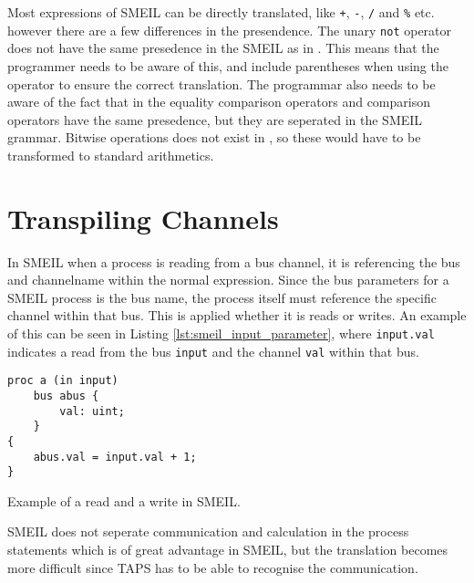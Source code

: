 Most expressions of SMEIL can be directly translated, like \texttt{+}, \texttt{-}, \texttt{/} and \texttt{\%} etc. however there are a few differences in the presendence. The unary \texttt{not} operator does not have the same presedence in the SMEIL as in \cspm{}. This means that the programmer needs to be aware of this, and include parentheses when using the operator to ensure the correct translation. The programmar also needs to be aware of the fact that in \cspm{} the equality comparison operators and comparison operators have the same presedence, but they are seperated in the SMEIL grammar.
Bitwise operations does not exist in \cspm{}, so these would have to be transformed to standard arithmetics. %

\section{Transpiling Channels}
In SMEIL when a process is reading from a bus channel, it is referencing the bus and channelname within the normal expression. Since the bus parameters for a SMEIL process is the bus name, the process itself must reference the specific channel within that bus. This is applied whether it is reads or writes.
An example of this can be seen in Listing \ref{lst:smeil_input_parameter}, where \texttt{input.val} indicates a read from the bus \texttt{input} and the channel \texttt{val} within that bus.

\begin{listing}
\begin{verbatim}
proc a (in input)
    bus abus {
        val: uint;
    }
{
    abus.val = input.val + 1;
}
\end{verbatim}
\caption{Example of a read and a write in SMEIL.}
\label{lst:smeil_input_parameter}
\end{listing}
SMEIL does not seperate communication and calculation in the process statements which is of great advantage in SMEIL, but the translation becomes more difficult since TAPS has to be able to recognise the communication.

